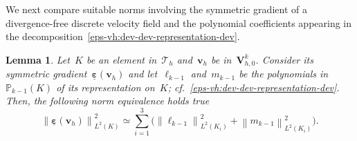 \documentclass[a4paper,twoside,10pt]{article}
\theoremstyle{plain}
\newtheorem{lemma}[theorem]{Lemma}
\theoremstyle{remark}
\theoremstyle{definition}
\numberwithin{equation}{section}
\numberwithin{figure}{section}
\newcommand{\Norm}[1]{{\left\|{#1} \right\|}}
\newcommand{\Pbbkmo}{\mathbb{P}_{k-1}}
\newcommand{\Tauh}{\mathcal{T}_h}
\newcommand{\K}{K}
\newcommand{\Vhkz}{\Vbf_{h,0}^k}
\newcommand{\vbfh}{\mathbf{v}_h}
\newcommand{\Ltwo}{L^2}
\newcommand{\epsbfun}{\underline{\boldsymbol{\varepsilon}}}
\newcommand{\lkmo}{\ell_{k-1}}
\newcommand{\mkmo}{m_{k-1}}
\newcommand{\Ki}{{\K_i}}
\newcommand{\Vbf}{\mathbf{V}}
\begin{document}
We next compare suitable norms involving
the symmetric gradient of a divergence-free discrete velocity field and
the polynomial coefficients appearing in the decomposition~\eqref{eps-vh:dev-dev-representation-dev}.
\begin{lemma} \label{lemma:norm-equivalence}
Let~$\K$ be an element in~$\Tauh$
and~$\vbfh$ be in~$\Vhkz$.
Consider its symmetric gradient~$\epsbfun(\vbfh)$
and let~$\lkmo$ and~$\mkmo$ be the polynomials in~$\Pbbkmo(\K)$
of its representation on~$\K$; cf.~\eqref{eps-vh:dev-dev-representation-dev}.
Then,
the following norm equivalence holds true
\begin{equation} \label{norm-equivalence:statement}
\Norm{\epsbfun(\vbfh)}_{\Ltwo(\K)}^2
\simeq \sum_{i = 1}^3\big(\Norm{\lkmo}_{\Ltwo(\Ki)}^2 + \Norm{\mkmo}_{\Ltwo(\Ki)}^2\big).
\end{equation}
\end{lemma}
\end{document}

